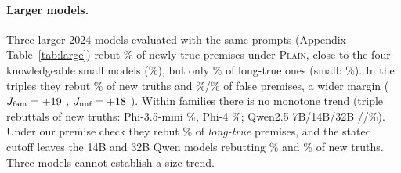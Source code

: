 \paragraph{Larger models.}
Three larger 2024 models evaluated with the same prompts (Appendix Table~\ref{tab:large}) rebut \WLPoolNewPlain\% of newly-true premises under \textsc{Plain}, close to the four knowledgeable small models (\WKnNewPlain\%), but only \WLPoolOldPlain\% of long-true ones (small: \WKnOldPlain\%). In the triples they rebut \WLPoolNPlain\% of new truths and \WLPoolAPlain\%/\WLPoolSPlain\% of false premises, a wider margin ($J_{\text{fam}}=+19$ \WLPoolJfamPlainCI, $J_{\text{unf}}=+18$ \WLPoolJunfPlainCI). Within families there is no monotone trend (triple rebuttals of new truths: Phi-3.5-mini \WSmPhiNPlain\%, Phi-4 \WLPhiFourNPlain\%; Qwen2.5 7B/14B/32B \WSmQSevenNPlain/\WLQFourteenNPlain/\WLQThirtyTwoNPlain\%). Under our premise check they rebut \WLPoolOldPrem\% of \emph{long-true} premises, and the stated cutoff leaves the 14B and 32B Qwen models rebutting \WLQFourteenNCut\% and \WLQThirtyTwoNCut\% of new truths. Three models cannot establish a size trend.


